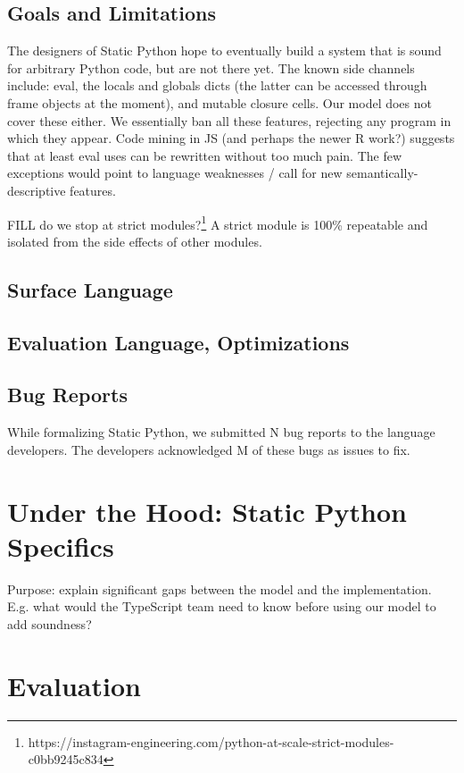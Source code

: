 \documentclass[a4paper,english,cleveref,autoref,thm-restate,anonymous,]{lipics-v2021}
\begin{document}
\subsection{Goals and Limitations}

The designers of Static Python hope to eventually build a system that is sound for arbitrary Python code,
but are not there yet.
The known side channels include:
eval, the locals and globals dicts (the latter can be accessed through frame objects at the moment),
and mutable closure cells.
Our model does not cover these either.
We essentially ban all these features, rejecting any program in which they appear.
Code mining in JS (and perhaps the newer R work?) suggests that at least eval
uses can be rewritten without too much pain. The few exceptions would point
to language weaknesses / call for new semantically-descriptive features.

FILL do we stop at strict modules?\footnote{https://instagram-engineering.com/python-at-scale-strict-modules-c0bb9245c834}
A strict module is 100\% repeatable and isolated from the side effects of other modules.



\subsection{Surface Language}


\subsection{Evaluation Language, Optimizations}


\subsection{Bug Reports}

While formalizing Static Python, we submitted N bug reports to the language developers.
The developers acknowledged M of these bugs as issues to fix.


\section{Under the Hood: Static Python Specifics}
\label{s:impl}

Purpose: explain significant gaps between the model and the implementation.
E.g. what would the TypeScript team need to know before using our model
to add soundness?


\section{Evaluation}
\label{s:eval}
\end{document}
